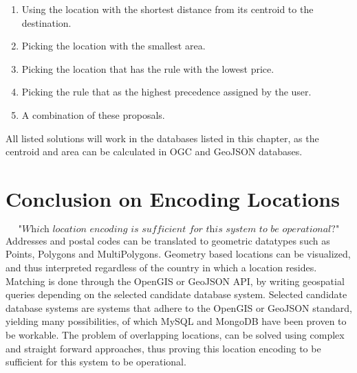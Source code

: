 \begin{enumerate}
	\item Using the location with the shortest distance from its centroid to the destination.
	\item Picking the location with the smallest area.
	\item Picking the location that has the rule with the lowest price.
	\item Picking the rule that as the highest precedence assigned by the user.
	\item A combination of these proposals.
\end{enumerate}

All listed solutions will work in the databases listed in this chapter, as the centroid and area can be calculated in OGC and GeoJSON databases.

%
\section{Conclusion on Encoding Locations}
\[\textit{"Which location encoding is sufficient for this system to be operational?"}\] \hfill
Addresses and postal codes can be translated to geometric datatypes such as Points, Polygons and MultiPolygons. Geometry based locations can be visualized, and thus interpreted regardless of the country in which a location resides. Matching is done through the OpenGIS or GeoJSON API, by writing geospatial queries depending on the selected candidate database system. Selected candidate database systems are systems that adhere to the OpenGIS or GeoJSON standard, yielding many possibilities, of which MySQL and MongoDB have been proven to be workable. The problem of overlapping locations, can be solved using complex and straight forward approaches, thus proving this location encoding to be sufficient for this system to be operational.
